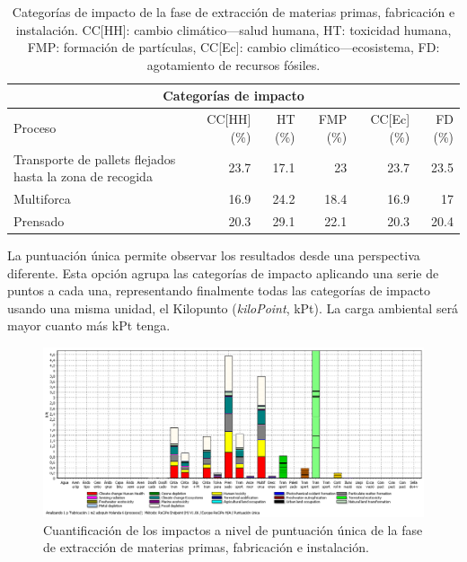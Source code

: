 \begin{table}[!htb]
\centering
\begin{tabular}{p{4cm}rrrrr}
\toprule
\multicolumn{6}{c}{Categorías de impacto}\\
\midrule
Proceso & CC[HH] (\%) & HT (\%) & FMP (\%) & CC[Ec] (\%) & FD (\%)\\
\midrule
Transporte de pallets flejados hasta la zona de recogida & 23.7 & 17.1 & 23 & 23.7 & 23.5\\
Multiforca & 16.9 & 24.2 & 18.4 & 16.9 & 17\\
Prensado & 20.3 & 29.1 & 22.1 & 20.3 & 20.4\\
\bottomrule
\end{tabular}
\caption[Categorías de impacto de la fase de extracción de materias primas, fabricación e instalación.]{Categorías de impacto de la fase de extracción de materias primas, fabricación e instalación. CC[HH]: cambio climático—salud humana, HT: toxicidad humana, FMP: formación de partículas, CC[Ec]: cambio climático—ecosistema, FD: agotamiento de recursos fósiles.}
\label{categoriasimpactofabricacion}
\end{table}

La puntuación única permite observar los resultados desde una perspectiva diferente. Esta opción agrupa las categorías de impacto aplicando una serie de puntos a cada una, representando finalmente todas las categorías de impacto usando una misma unidad, el Kilopunto (\textit{kiloPoint}, kPt). La carga ambiental será mayor cuanto más kPt tenga.

\begin{figure}[!htb]
\centering
\includegraphics[width=15cm]{img/fabric_puntuacionunica.png}
\caption{Cuantificación de los impactos a nivel de puntuación única de la fase de extracción de materias primas, fabricación e instalación.}
\label{fig:fabric_puntuacionunica}
\end{figure}

